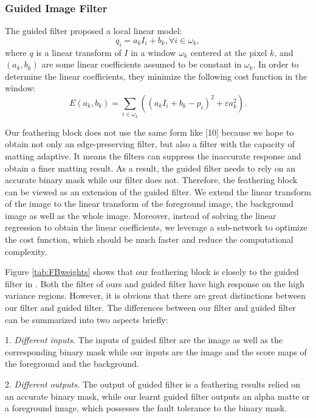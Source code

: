 \documentclass[sigconf]{acmart}
\begin{document}
\subsubsection{Guided Image Filter}
The guided filter \cite{he2013guided} proposed a local linear model:
\begin{equation}{q_i} = {a_k}{I_i} + {b_k},\forall i \in {\omega _k},
\end{equation}
where $q$ is a linear transform of $I$ in a window ${\omega _k}$ centered at the pixel $k$, and $\left( {{a_k},{b_k}} \right)$ are some linear coefficients assumed to be constant in ${\omega _k}$. In order to determine the linear coefficients, they minimize the following cost function in the window:
\begin{equation}
E\left( {{a_k},{b_k}} \right) = \sum\limits_{i \in {\omega _k}} {\left( {{{\left( {{a_k}{I_i} + {b_k} - {p_i}} \right)}^2} + \varepsilon a_k^2} \right)}.
\end{equation}

Our feathering block does not use the same form like [10] because we hope to obtain not only an edge-preserving filter, but also a filter with the capacity of matting adaptive. It means the filters can suppress the inaccurate response and obtain a finer matting result. As a result, the guided filter needs to rely on an accurate binary mask while our filter does not. Therefore, the feathering block can be viewed as an extension of the guided filter. We extend the linear transform of the image to the linear transform of the foreground image, the background image as well as the whole image. Moreover, instead of solving the linear regression to obtain the linear coefficients, we leverage a sub-network to optimize the cost function, which should be much faster and reduce the computational complexity.

Figure \ref{tab:FBweights} shows that our feathering block is closely to the guided filter in \cite{he2013guided}. Both the filter of ours and guided filter have high response on the high variance regions. However, it is obvious that there are great distinctions between our filter and guided filter. The differences between our filter and guided filter can be summarized into two aspects briefly:

1. \textit{Different inputs.} The inputs of guided filter are the image as well as the corresponding binary mask while our inputs are the image and the score maps of the foreground and the background.

2. \textit{Different outputs.} The output of guided filter is a feathering results relied on an accurate binary mask, while our learnt guided filter outputs an alpha matte or a foreground image, which possesses the fault tolerance to the binary mask.
\end{document}

